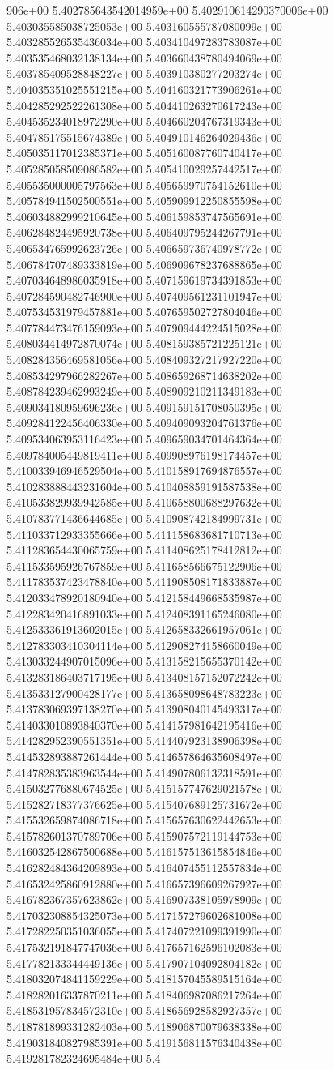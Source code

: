 906e+00	5.402785643542014959e+00	5.402910614290370006e+00	5.403035585038725053e+00	5.403160555787080099e+00	5.403285526535436034e+00	5.403410497283783087e+00	5.403535468032138134e+00	5.403660438780494069e+00	5.403785409528848227e+00	5.403910380277203274e+00	5.404035351025551215e+00	5.404160321773906261e+00	5.404285292522261308e+00	5.404410263270617243e+00	5.404535234018972290e+00	5.404660204767319343e+00	5.404785175515674389e+00	5.404910146264029436e+00	5.405035117012385371e+00	5.405160087760740417e+00	5.405285058509086582e+00	5.405410029257442517e+00	5.405535000005797563e+00	5.405659970754152610e+00	5.405784941502500551e+00	5.405909912250855598e+00	5.406034882999210645e+00	5.406159853747565691e+00	5.406284824495920738e+00	5.406409795244267791e+00	5.406534765992623726e+00	5.406659736740978772e+00	5.406784707489333819e+00	5.406909678237688865e+00	5.407034648986035918e+00	5.407159619734391853e+00	5.407284590482746900e+00	5.407409561231101947e+00	5.407534531979457881e+00	5.407659502727804046e+00	5.407784473476159093e+00	5.407909444224515028e+00	5.408034414972870074e+00	5.408159385721225121e+00	5.408284356469581056e+00	5.408409327217927220e+00	5.408534297966282267e+00	5.408659268714638202e+00	5.408784239462993249e+00	5.408909210211349183e+00	5.409034180959696236e+00	5.409159151708050395e+00	5.409284122456406330e+00	5.409409093204761376e+00	5.409534063953116423e+00	5.409659034701464364e+00	5.409784005449819411e+00	5.409908976198174457e+00	5.410033946946529504e+00	5.410158917694876557e+00	5.410283888443231604e+00	5.410408859191587538e+00	5.410533829939942585e+00	5.410658800688297632e+00	5.410783771436644685e+00	5.410908742184999731e+00	5.411033712933355666e+00	5.411158683681710713e+00	5.411283654430065759e+00	5.411408625178412812e+00	5.411533595926767859e+00	5.411658566675122906e+00	5.411783537423478840e+00	5.411908508171833887e+00	5.412033478920180940e+00	5.412158449668535987e+00	5.412283420416891033e+00	5.412408391165246080e+00	5.412533361913602015e+00	5.412658332661957061e+00	5.412783303410304114e+00	5.412908274158660049e+00	5.413033244907015096e+00	5.413158215655370142e+00	5.413283186403717195e+00	5.413408157152072242e+00	5.413533127900428177e+00	5.413658098648783223e+00	5.413783069397138270e+00	5.413908040145493317e+00	5.414033010893840370e+00	5.414157981642195416e+00	5.414282952390551351e+00	5.414407923138906398e+00	5.414532893887261444e+00	5.414657864635608497e+00	5.414782835383963544e+00	5.414907806132318591e+00	5.415032776880674525e+00	5.415157747629021578e+00	5.415282718377376625e+00	5.415407689125731672e+00	5.415532659874086718e+00	5.415657630622442653e+00	5.415782601370789706e+00	5.415907572119144753e+00	5.416032542867500688e+00	5.416157513615854846e+00	5.416282484364209893e+00	5.416407455112557834e+00	5.416532425860912880e+00	5.416657396609267927e+00	5.416782367357623862e+00	5.416907338105978909e+00	5.417032308854325073e+00	5.417157279602681008e+00	5.417282250351036055e+00	5.417407221099391990e+00	5.417532191847747036e+00	5.417657162596102083e+00	5.417782133344449136e+00	5.417907104092804182e+00	5.418032074841159229e+00	5.418157045589515164e+00	5.418282016337870211e+00	5.418406987086217264e+00	5.418531957834572310e+00	5.418656928582927357e+00	5.418781899331282403e+00	5.418906870079638338e+00	5.419031840827985391e+00	5.419156811576340438e+00	5.419281782324695484e+00	5.4